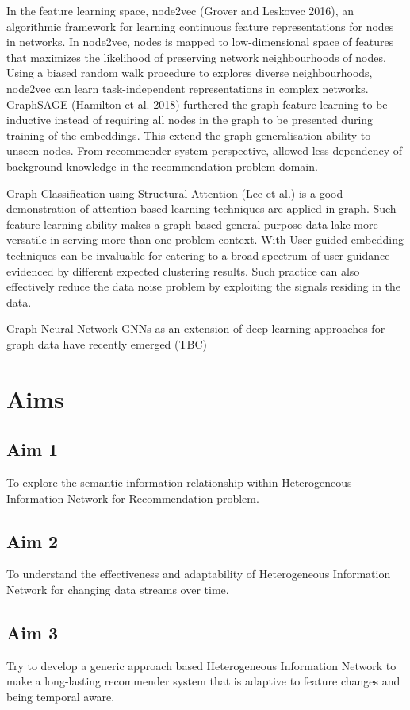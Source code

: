 \documentclass[12pt,a4 paper,title page]{article}
\begin{document}
In the feature learning space, node2vec (Grover and Leskovec 2016), an algorithmic framework for learning continuous feature representations for nodes in networks. In node2vec, nodes is mapped to low-dimensional space of features that maximizes the likelihood of preserving network neighbourhoods of nodes. Using a biased random walk procedure to explores diverse neighbourhoods, node2vec can learn task-independent representations in complex networks. GraphSAGE (Hamilton et al. 2018) furthered the graph feature learning to be inductive instead of requiring all nodes in the graph to be presented during training of the embeddings. This extend the graph generalisation ability to unseen nodes. From recommender system perspective, allowed less dependency of background knowledge in the recommendation problem domain.  

Graph Classification using Structural Attention (Lee et al.) is a good demonstration of attention-based learning techniques are applied in graph. Such feature learning ability makes a graph based general purpose data lake more versatile in serving more than one problem context. With User-guided embedding techniques can be invaluable for catering to a broad spectrum of user guidance evidenced by different expected clustering results. Such practice can also effectively reduce the data noise problem by exploiting the signals residing in the data.  

Graph Neural Network GNNs as an extension of deep learning approaches for graph data have recently emerged (TBC)

\section{Aims}
\subsection{Aim 1}
To explore the semantic information relationship within Heterogeneous Information Network for Recommendation problem.

\subsection{Aim 2}
To understand the effectiveness and adaptability of Heterogeneous Information Network for changing data streams over time. 

\subsection{Aim 3}
Try to develop a generic approach based Heterogeneous Information Network to make a long-lasting recommender system that is adaptive to feature changes and being temporal aware. 
\end{document}
